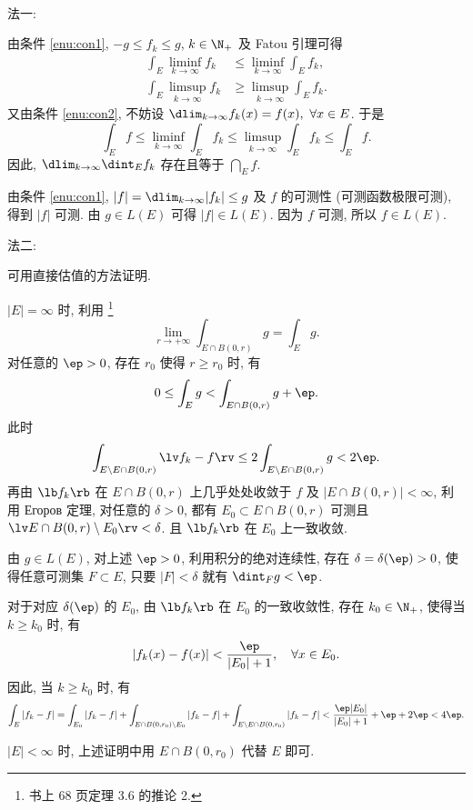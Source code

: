 \documentclass[UTF8, a4paper, 12pt, twoside, onecolumn]{book}
\begin{document}
\begin{Proof}~

	{\heiti 法一}:

	由条件 \eqref{enu:con1}, $-g \leq f_k \leq g$, $k \in \N_+$  及 Fatou 引理可得
	\begin{align*}
		\int_E \liminf_{k \to \infty} f_k &\leq \liminf_{k \to \infty} \int_E f_k,\\
		\int_E \limsup_{k \to \infty} f_k &\geq \limsup_{k \to \infty} \int_E f_k.
	\end{align*}
	又由条件 \eqref{enu:con2}, 不妨设 $\dlim_{k \to \infty} f_k(x) = f(x),~\forall x \in E$. 于是
	$$\int_E f \leq \liminf_{k \to \infty} \int_E f_k \leq \limsup_{k \to \infty} \int_E f_k \leq \int_E f.$$
	因此, $\dlim_{k \to \infty} \dint_E f_k$ 存在且等于 $\dint_E f$.

	由条件 \eqref{enu:con1}, $|f| = \dlim_{k \to \infty} |f_k| \leq g$ 及 $f$ 的可测性 (可测函数极限可测), 得到 $|f|$ 可测. 由 $g \in L(E)$ 可得 $|f| \in L(E)$. 因为 $f$ 可测, 所以 $f \in L(E)$.

	{\heiti 法二}:

	可用直接估值的方法证明.

	$|E| = \infty$ 时, 利用 \footnote{书上 68 页定理 3.6 的推论 2.}
	$$\lim_{r \to +\infty} \int_{E \cap B(0, r)} g = \int_E g.$$
	对任意的 $\ep > 0$, 存在 $r_0$ 使得 $r \geq r_0$ 时, 有
	$$0 \leq \int_E g < \int_{E \cap B(0 , r)} g + \ep.$$
	此时
	$$\int_{E \setminus E \cap B(0, r)} \lv f_k - f\rv \leq 2\int_{E \setminus E \cap B(0, r)} g < 2\ep.$$
	再由 $\lb f_k \rb$ 在 $E \cap B(0, r)$ 上几乎处处收敛于 $f$ 及 $|E \cap B(0, r)| < \infty$, 利用 Егоров 定理, 对任意的 $\delta > 0$, 都有 $E_0 \subset E \cap B(0, r)$ 可测且 $\lv E \cap B(0 , r) \setminus E_0\rv < \delta$. 且 $\lb f_k \rb$ 在 $E_0$ 上一致收敛.

	由 $g \in L(E)$, 对上述 $\ep > 0$, 利用积分的绝对连续性, 存在 $\delta = \delta(\ep) > 0$, 使得任意可测集 $F \subset E$, 只要 $|F| < \delta$ 就有 $\dint_F g < \ep$.

	对于对应 $\delta(\ep)$ 的 $E_0$, 由 $\lb f_k \rb$ 在 $E_0$ 的一致收敛性, 存在 $k_0 \in \N_+$, 使得当 $k \geq k_0$ 时, 有
	$$|f_k(x) - f(x)| < \frac{\ep}{|E_0| + 1},\quad \forall x \in E_0.$$
	因此, 当 $k \geq k_0$ 时, 有
	$$\int_E |f_k - f| = \int_{E_0} |f_k  - f| + \int_{E \cap B(0, r_0) \setminus E_0} |f_k - f| + \int_{E \setminus E \cap B(0, r_0)} |f_k - f| < \frac{\ep |E_0|}{|E_0| + 1} + \ep + 2\ep < 4\ep.$$

	$|E| < \infty$ 时, 上述证明中用 $E \cap B(0 , r_0)$ 代替 $E$ 即可.
\end{Proof}
\end{document}
